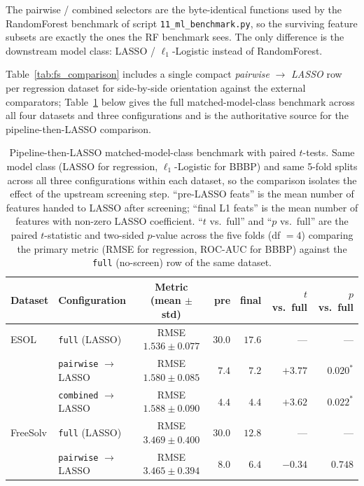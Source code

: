 \documentclass[STIX1COL]{WileyNJDv5}
\theoremstyle{definition}
\begin{document}
The pairwise / combined selectors are the byte-identical functions
used by the RandomForest benchmark of script
\texttt{11\_ml\_benchmark.py}, so the surviving feature subsets are
exactly the ones the RF benchmark sees. The only difference is the
downstream model class: LASSO / $\ell_1$-Logistic instead of
RandomForest.

Table~\ref{tab:fs_comparison} includes a single compact
\emph{pairwise} $\to$ \emph{LASSO} row per regression dataset for
side-by-side orientation against the external comparators;
Table~\ref{tab:matched_class} below gives the full matched-model-class
benchmark across all four datasets and three configurations and is
the authoritative source for the pipeline-then-LASSO comparison.

\begin{table}[!htbp]
\centering
\small
\caption{Pipeline-then-LASSO matched-model-class benchmark with paired $t$-tests. Same model class (LASSO for regression, $\ell_1$-Logistic for BBBP) and same 5-fold splits across all three configurations within each dataset, so the comparison isolates the effect of the upstream screening step. ``pre-LASSO feats'' is the mean number of features handed to LASSO after screening; ``final L1 feats'' is the mean number of features with non-zero LASSO coefficient. ``$t$ vs.\ full'' and ``$p$ vs.\ full'' are the paired $t$-statistic and two-sided $p$-value across the five folds (df $=4$) comparing the primary metric (RMSE for regression, ROC-AUC for BBBP) against the \texttt{full} (no-screen) row of the same dataset.}
\label{tab:matched_class}
\begin{tabular}{llcrrrr}
\toprule
Dataset & Configuration & Metric (mean $\pm$ std) & pre & final & $t$ vs.\ full & $p$ vs.\ full\\
\midrule
ESOL          & \texttt{full} (LASSO)                       & RMSE $1.536\pm 0.077$  & $30.0$         & $17.6$ & --- & ---\\
              & \texttt{pairwise} $\to$ LASSO               & RMSE $1.580\pm 0.085$  & $\phantom{0}7.4$ & $\phantom{0}7.2$ & $+3.77$ & $0.020^{*}$\\
              & \texttt{combined} $\to$ LASSO               & RMSE $1.588\pm 0.090$  & $\phantom{0}4.4$ & $\phantom{0}4.4$ & $+3.62$ & $0.022^{*}$\\
\midrule
FreeSolv      & \texttt{full} (LASSO)                       & RMSE $3.469\pm 0.400$  & $30.0$         & $12.8$ & --- & ---\\
              & \texttt{pairwise} $\to$ LASSO               & RMSE $3.465\pm 0.394$  & $\phantom{0}8.0$ & $\phantom{0}6.4$ & $-0.34$ & $0.748$\\

\end{tabular}
\end{table}
\end{document}
